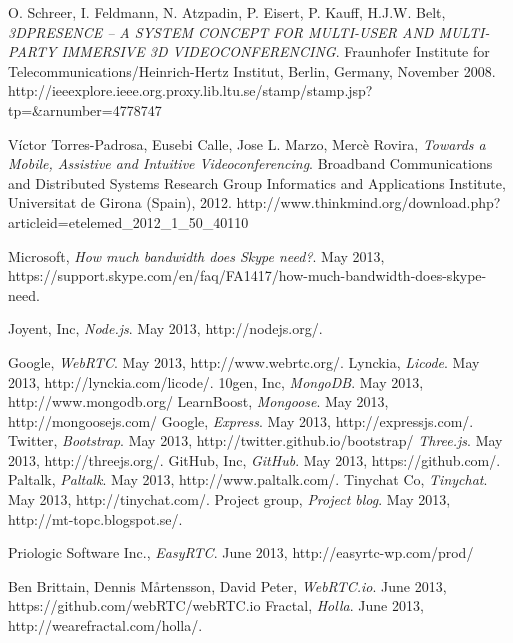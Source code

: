 \documentclass[12pt, titlepage]{article}
\begin{document}
\begin{thebibliography}{9}
O. Schreer, I. Feldmann, N. Atzpadin, P. Eisert, P. Kauff, H.J.W. Belt, 
\emph{3DPRESENCE – A SYSTEM CONCEPT FOR MULTI-USER AND MULTI-PARTY IMMERSIVE 3D VIDEOCONFERENCING}.
Fraunhofer Institute for Telecommunications/Heinrich-Hertz Institut, Berlin, Germany, November 2008.
http://ieeexplore.ieee.org.proxy.lib.ltu.se/stamp/stamp.jsp?tp=\&arnumber=4778747

Víctor Torres-Padrosa, Eusebi Calle, Jose L. Marzo, Mercè Rovira,
\emph{Towards a Mobile, Assistive and Intuitive Videoconferencing}.
Broadband Communications and Distributed Systems Research Group Informatics and Applications Institute, Universitat de Girona (Spain), 2012.
http://www.thinkmind.org/download.php?articleid=etelemed\_2012\_1\_50\_40110

Microsoft,
\emph{ How much bandwidth does Skype need?}.
May 2013,
https://support.skype.com/en/faq/FA1417/how-much-bandwidth-does-skype-need.

  Joyent, Inc,
  \emph{Node.js}.
  May 2013,
  http://nodejs.org/.
  
  Google,
  \emph{WebRTC}.
  May 2013,
  http://www.webrtc.org/.  
  Lynckia,
  \emph{Licode}.
  May 2013,
  http://lynckia.com/licode/.
  10gen, Inc,
  \emph{MongoDB}.
  May 2013,
  http://www.mongodb.org/
  LearnBoost,
  \emph{Mongoose}.
  May 2013,
  http://mongoosejs.com/
  Google,
  \emph{Express}.
  May 2013,
  http://expressjs.com/.
  Twitter,
  \emph{Bootstrap}.
  May 2013,
  http://twitter.github.io/bootstrap/
  \emph{Three.js}.
  May 2013,
  http://threejs.org/.
  GitHub, Inc,
  \emph{GitHub}.
  May 2013,
  https://github.com/.
  Paltalk,
  \emph{Paltalk}.
  May 2013,
  http://www.paltalk.com/.
  Tinychat Co,
  \emph{Tinychat}.
  May 2013,
  http://tinychat.com/.
  Project group,
  \emph{Project blog}.
  May 2013,
  http://mt-topc.blogspot.se/.
  
  Priologic Software Inc.,
  \emph{EasyRTC}.
  June 2013,
  http://easyrtc-wp.com/prod/

  Ben Brittain, Dennis Mårtensson, David Peter,
  \emph{WebRTC.io}.
  June 2013,
  https://github.com/webRTC/webRTC.io
  Fractal,
  \emph{Holla}.
  June 2013,
   http://wearefractal.com/holla/.       
\end{thebibliography}


\end{document}
